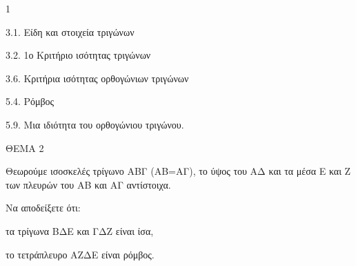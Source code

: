 \begin{ylh}{1}
    \item 3.1. Είδη και στοιχεία τριγώνων
    \item 3.2. 1ο Κριτήριο ισότητας τριγώνων
    \item 3.6. Κριτήρια ισότητας ορθογώνιων τριγώνων
    \item 5.4. Ρόμβος
    \item 5.9. Μια ιδιότητα του ορθογώνιου τριγώνου.
\end{ylh}

ΘΕΜΑ 2

Θεωρούμε ισοσκελές τρίγωνο ΑΒΓ (ΑΒ=ΑΓ), το ύψος του ΑΔ και τα μέσα Ε και Ζ των πλευρών του ΑΒ και ΑΓ αντίστοιχα.

Να αποδείξετε ότι:

\begin{alist}
\item τα τρίγωνα ΒΔΕ και ΓΔΖ είναι ίσα, 

\item το τετράπλευρο ΑΖΔΕ είναι ρόμβος. 


\begin{center}
\end{center}
\end{alist}
